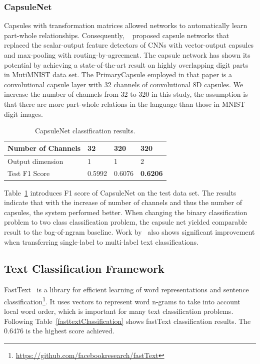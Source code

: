 \documentclass[11pt]{article}
\begin{document}
\subsubsection{CapsuleNet}
Capsules with transformation matrices allowed networks to automatically learn part-whole relationships. Consequently, ~\cite{2017arXiv171009829S} proposed capsule networks that replaced the scalar-output feature detectors of CNNs with vector-output capsules and max-pooling with routing-by-agreement. The capsule network has shown its potential by achieving a state-of-the-art result on highly overlapping digit parts in MutiMNIST data set. The PrimaryCapsule employed in that paper is a convolutional capsule layer with 32 channels of convolutional 8D capsules. We increase the number of channels from 32 to 320 in this study, the assumption is that there are more part-whole relations in the language than those in MNIST digit images. 


\begin{table}[h]
	\centering
	
	
	\begin{tabular}{|l|l|l|l|}
		\hline
		Number of Channels & 32 & 320 & 320 \\ \hline
		Output dimension   & 1      & 1               & 2      \\ \hline
		Test F1 Score & 0.5992 & 0.6076 & \textbf{0.6206} \\ \hline
	\end{tabular}
	\caption{CapsuleNet classification results. }
	\label{CapsuleNetTB}
\end{table}


Table~\ref{CapsuleNetTB} introduces F1 score of CapsuleNet on the test data set. The results indicate that with the increase of number of channels and thus the number of capsules, the system performed better. When changing the binary classification problem to two class classification problem, the capsule net yielded comparable result to the bag-of-ngram baseline. Work by~\cite{2018arXiv180400538Z} also shows significant improvement when transferring single-label to multi-label text classifications.




\subsection{Text Classification Framework}
FastText~\cite{joulin2016bag} is a library for efficient learning of word representations and sentence classification\footnote{\url{https://github.com/facebookresearch/fastText}}. It uses vectors to represent word n-grams to take into account local word order, which is important for many text classification problems. Following Table~\ref{fasttextClassification} shows fastText classification results. The 0.6476 is the highest score achieved.
\end{document}
